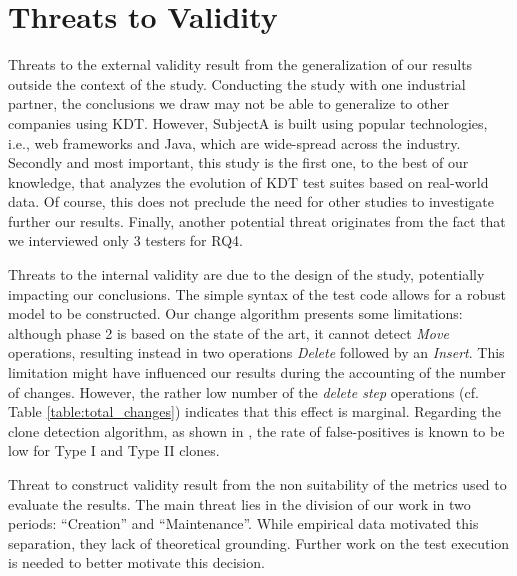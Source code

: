 \section{Threats to Validity}

Threats to the external validity result from the generalization of our results outside the context of the study. Conducting the study with one industrial partner, the conclusions we draw may not be able to generalize to other companies using KDT. However, SubjectA is built using popular technologies, i.e., web frameworks and Java, which are wide-spread across the industry. Secondly and most important, this study is the first one, to the best of our knowledge, that analyzes the evolution of KDT test suites based on real-world data. Of course, this does not preclude the need for other studies to investigate further our results. Finally, another potential threat originates from the fact that we interviewed only 3 testers for RQ4.

Threats to the internal validity are due to the design of the study, potentially impacting our conclusions. The simple syntax of the test code allows for a robust model to be constructed. Our change algorithm presents some limitations: although phase 2 is based on the state of the art, it cannot detect \emph{Move} operations, resulting instead in two operations \emph{Delete} followed by an \emph{Insert}. This limitation might have influenced our results during the accounting of the number of changes. However, the rather low number of the \emph{delete step} operations (cf. Table \ref{table:total_changes}) indicates that this effect is marginal. Regarding the clone detection algorithm, as shown in \cite{Roy2009}, the rate of false-positives is known to be low for Type I and Type II clones.

Threat to construct validity result from the non suitability of the metrics used to evaluate the results. The main threat lies in the division of our work in two periods: ``Creation'' and ``Maintenance''. While empirical data motivated this separation, they lack of theoretical grounding. Further work on the test execution is needed to better motivate this decision.
